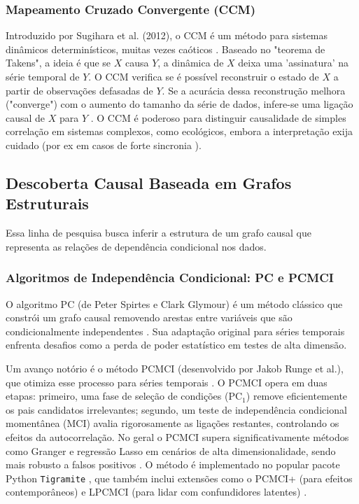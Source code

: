 \documentclass[12pt, a4paper]{article}
\begin{document}
\subsubsection{Mapeamento Cruzado Convergente (CCM)}
Introduzido por Sugihara et al. (2012), o CCM é um método para sistemas dinâmicos determinísticos, muitas vezes caóticos \cite{sugihara2012}. Baseado no "teorema de Takens", a ideia é que se $X$ causa $Y$, a dinâmica de $X$ deixa uma 'assinatura' na série temporal de $Y$. O CCM verifica se é possível reconstruir o estado de $X$ a partir de observações defasadas de $Y$. Se a acurácia dessa reconstrução melhora ("converge") com o aumento do tamanho da série de dados, infere-se uma ligação causal de $X$ para $Y$ \cite{sugihara2012}. O CCM é poderoso para distinguir causalidade de simples correlação em sistemas complexos, como ecológicos, embora a interpretação exija cuidado (por ex em casos de forte sincronia \cite{ye2015ccm} ).

\subsection{Descoberta Causal Baseada em Grafos Estruturais}

Essa linha de pesquisa busca inferir a estrutura de um grafo causal que representa as relações de dependência condicional nos dados.

\subsubsection{Algoritmos de Independência Condicional: PC e PCMCI}
O algoritmo PC (de Peter Spirtes e Clark Glymour) é um método clássico que constrói um grafo causal removendo arestas entre variáveis que são condicionalmente independentes \cite{spirtes2000}. Sua adaptação original para séries temporais enfrenta desafios como a perda de poder estatístico em testes de alta dimensão.

Um avanço notório é o método PCMCI (desenvolvido por Jakob Runge et al.), que otimiza esse processo para séries temporais \cite{runge2019}. O PCMCI opera em duas etapas: primeiro, uma fase de seleção de condições (PC$_1$) remove eficientemente os pais candidatos irrelevantes; segundo, um teste de independência condicional momentânea (MCI) avalia rigorosamente as ligações restantes, controlando os efeitos da autocorrelação. No geral o PCMCI supera significativamente métodos como Granger e regressão Lasso em cenários de alta dimensionalidade, sendo mais robusto a falsos positivos \cite{runge2019, kretschmer2024review}. O método é implementado no popular pacote Python \texttt{Tigramite} \cite{tigramite-docs}, que também inclui extensões como o PCMCI+ (para efeitos contemporâneos) e LPCMCI (para lidar com confundidores latentes) \cite{runge2020, kretschmer2024review}.
\end{document}
